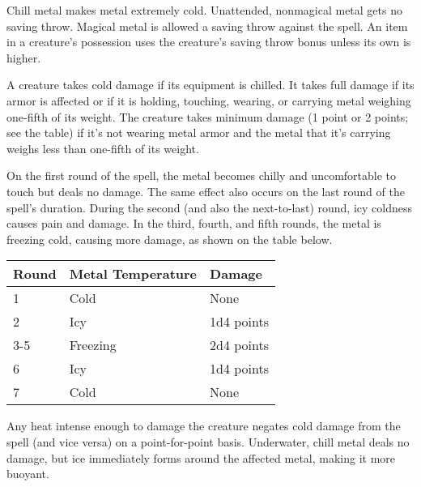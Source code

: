 \begin{multicols}{2}
\begin{small}
\noindent Chill metal makes metal extremely cold. Unattended, nonmagical metal gets no saving throw. Magical metal is allowed a saving throw against the spell. An item in a creature's possession uses the creature's saving throw bonus unless its own is higher.

\smallskip\noindent A creature takes cold damage if its equipment is chilled. It takes full damage if its armor is affected or if it is holding, touching, wearing, or carrying metal weighing one-fifth of its weight. The creature takes minimum damage (1 point or 2 points; see the table) if it's not wearing metal armor and the metal that it's carrying weighs less than one-fifth of its weight.

\smallskip\noindent On the first round of the spell, the metal becomes chilly and uncomfortable to touch but deals no damage. The same effect also occurs on the last round of the spell's duration. During the second (and also the next-to-last) round, icy coldness causes pain and damage. In the third, fourth, and fifth rounds, the metal is freezing cold, causing more damage, as shown on the table below.

\begin{center}
\begin{tabular}[h!]{l|l|l}
Round & Metal Temperature & Damage \\ \hline
1 & Cold & None \\
2 & Icy & 1d4 points \\
3-5 & Freezing & 2d4 points \\
6 & Icy & 1d4 points \\
7 & Cold & None \\
\end{tabular}
\end{center}

\smallskip\noindent Any heat intense enough to damage the creature negates cold damage from the spell (and vice versa) on a point-for-point basis. Underwater, chill metal deals no damage, but ice immediately forms around the affected metal, making it more buoyant.


\end{small}
\end{multicols}
